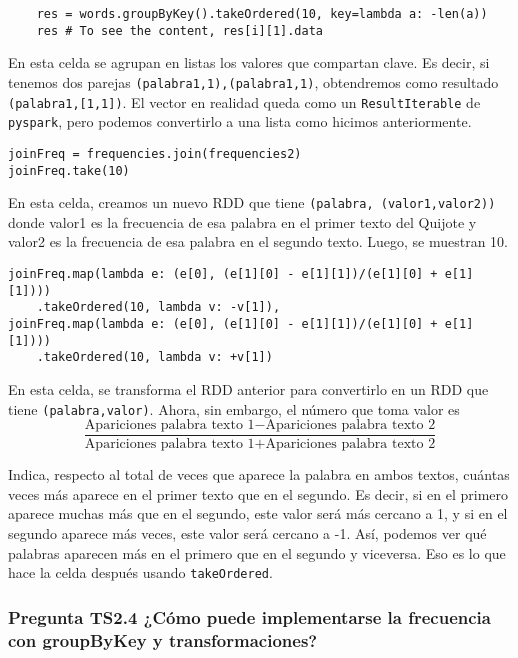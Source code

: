\documentclass[11pt]{article}
\def\inline{\lstinline[basicstyle=\ttfamily,keywordstyle={}]}
\begin{document}
\begin{verbatim}
    res = words.groupByKey().takeOrdered(10, key=lambda a: -len(a))
    res # To see the content, res[i][1].data
\end{verbatim}

En esta celda se agrupan en listas los valores que compartan clave. Es decir, si tenemos dos parejas \inline{(palabra1,1),(palabra1,1)}, obtendremos como resultado \inline{(palabra1,[1,1])}. El vector en realidad queda como un \inline{ResultIterable} de \inline{pyspark}, pero podemos convertirlo a una lista como hicimos anteriormente.



\begin{verbatim}
joinFreq = frequencies.join(frequencies2)
joinFreq.take(10)
\end{verbatim}
En esta celda, creamos un nuevo RDD que tiene \inline{(palabra, (valor1,valor2))} donde valor1 es la frecuencia de esa palabra en el primer texto del Quijote y valor2 es la frecuencia de esa palabra en el segundo texto. Luego, se muestran 10.



\begin{verbatim}
joinFreq.map(lambda e: (e[0], (e[1][0] - e[1][1])/(e[1][0] + e[1][1])))
    .takeOrdered(10, lambda v: -v[1]),
joinFreq.map(lambda e: (e[0], (e[1][0] - e[1][1])/(e[1][0] + e[1][1])))
    .takeOrdered(10, lambda v: +v[1])
\end{verbatim}

En esta celda, se transforma el RDD anterior para convertirlo en un RDD que tiene \inline{(palabra,valor)}. Ahora, sin embargo, el número que toma valor es 
\[
\frac{\text{Apariciones palabra texto 1} - \text{Apariciones palabra texto 2}}{\text{Apariciones palabra texto 1} + \text{Apariciones palabra texto 2}}    
\]

Indica, respecto al total de veces que aparece la palabra en ambos textos, cuántas veces más aparece en el primer texto que en el segundo. Es decir, si en el primero aparece muchas más que en el segundo, este valor será más cercano a 1, y si en el segundo aparece más veces, este valor será cercano a -1. Así, podemos ver qué palabras aparecen más en el primero que en el segundo y viceversa. Eso es lo que hace la celda después usando \inline{takeOrdered}.

\subsubsection*{Pregunta TS2.4 ¿Cómo puede implementarse la frecuencia con groupByKey y transformaciones? }
\end{document}
